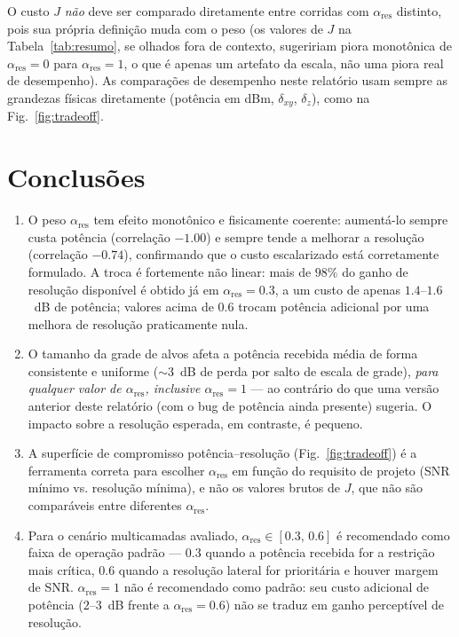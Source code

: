 \documentclass[11pt, a4paper]{article}
\newcommand{\dxy}{\delta_{xy}}
\newcommand{\dz}{\delta_z}
\newcommand{\alphares}{\alpha_{\mathrm{res}}}
\begin{document}
O custo $J$ \emph{não} deve ser comparado diretamente entre corridas com
$\alphares$ distinto, pois sua própria definição muda com o peso (os valores de
$J$ na Tabela~\ref{tab:resumo}, se olhados fora de contexto, sugeririam
piora monotônica de $\alphares=0$ para $\alphares=1$, o que é apenas um
artefato da escala, não uma piora real de desempenho). As comparações de
desempenho neste relatório usam sempre as grandezas físicas diretamente
(potência em dBm, $\dxy$, $\dz$), como na Fig.~\ref{fig:tradeoff}.

\section{Conclusões}

\begin{enumerate}
  \item O peso $\alphares$ tem efeito monotônico e fisicamente coerente:
        aumentá-lo sempre custa potência (correlação $-1.00$) e sempre tende a
        melhorar a resolução (correlação $-0.74$), confirmando que o custo
        escalarizado está corretamente formulado. A troca é fortemente
        não linear: mais de $98\%$ do ganho de resolução disponível é obtido
        já em $\alphares=0.3$, a um custo de apenas $1.4$--$1.6$~dB de
        potência; valores acima de $0.6$ trocam potência adicional por uma
        melhora de resolução praticamente nula.
  \item O tamanho da grade de alvos afeta a potência recebida média de forma
        consistente e uniforme ($\sim$3~dB de perda por salto de escala de
        grade), \emph{para qualquer valor de $\alphares$, inclusive
        $\alphares=1$} — ao contrário do que uma versão anterior deste
        relatório (com o bug de potência ainda presente) sugeria. O impacto
        sobre a resolução esperada, em contraste, é pequeno.
  \item A superfície de compromisso potência--resolução (Fig.~\ref{fig:tradeoff})
        é a ferramenta correta para escolher $\alphares$ em função do requisito
        de projeto (SNR mínimo vs. resolução mínima), e não os valores brutos
        de $J$, que não são comparáveis entre diferentes $\alphares$.
  \item Para o cenário multicamadas avaliado, $\alphares \in [0.3,\,0.6]$ é
        recomendado como faixa de operação padrão — $0.3$ quando a potência
        recebida for a restrição mais crítica, $0.6$ quando a resolução
        lateral for prioritária e houver margem de SNR. $\alphares=1$ não é
        recomendado como padrão: seu custo adicional de potência
        ($2$--$3$~dB frente a $\alphares=0.6$) não se traduz em ganho
        perceptível de resolução.
\end{enumerate}
\end{document}
